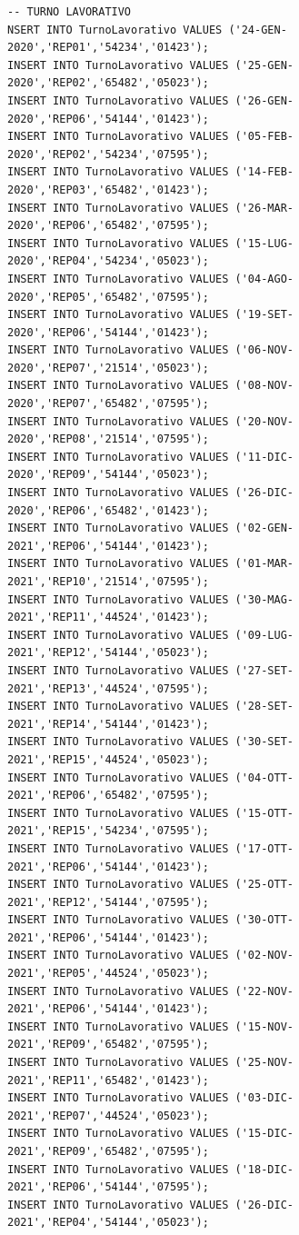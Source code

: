 \documentclass[12pt]{report}
\begin{document}
\begin{scriptsize}
\begin{verbatim}
-- TURNO LAVORATIVO
NSERT INTO TurnoLavorativo VALUES ('24-GEN-2020','REP01','54234','01423');
INSERT INTO TurnoLavorativo VALUES ('25-GEN-2020','REP02','65482','05023');
INSERT INTO TurnoLavorativo VALUES ('26-GEN-2020','REP06','54144','01423');
INSERT INTO TurnoLavorativo VALUES ('05-FEB-2020','REP02','54234','07595');
INSERT INTO TurnoLavorativo VALUES ('14-FEB-2020','REP03','65482','01423');
INSERT INTO TurnoLavorativo VALUES ('26-MAR-2020','REP06','65482','07595');
INSERT INTO TurnoLavorativo VALUES ('15-LUG-2020','REP04','54234','05023');
INSERT INTO TurnoLavorativo VALUES ('04-AGO-2020','REP05','65482','07595');
INSERT INTO TurnoLavorativo VALUES ('19-SET-2020','REP06','54144','01423');
INSERT INTO TurnoLavorativo VALUES ('06-NOV-2020','REP07','21514','05023');
INSERT INTO TurnoLavorativo VALUES ('08-NOV-2020','REP07','65482','07595');
INSERT INTO TurnoLavorativo VALUES ('20-NOV-2020','REP08','21514','07595');
INSERT INTO TurnoLavorativo VALUES ('11-DIC-2020','REP09','54144','05023');
INSERT INTO TurnoLavorativo VALUES ('26-DIC-2020','REP06','65482','01423');
INSERT INTO TurnoLavorativo VALUES ('02-GEN-2021','REP06','54144','01423');
INSERT INTO TurnoLavorativo VALUES ('01-MAR-2021','REP10','21514','07595');
INSERT INTO TurnoLavorativo VALUES ('30-MAG-2021','REP11','44524','01423');
INSERT INTO TurnoLavorativo VALUES ('09-LUG-2021','REP12','54144','05023');
INSERT INTO TurnoLavorativo VALUES ('27-SET-2021','REP13','44524','07595');
INSERT INTO TurnoLavorativo VALUES ('28-SET-2021','REP14','54144','01423');
INSERT INTO TurnoLavorativo VALUES ('30-SET-2021','REP15','44524','05023');
INSERT INTO TurnoLavorativo VALUES ('04-OTT-2021','REP06','65482','07595');
INSERT INTO TurnoLavorativo VALUES ('15-OTT-2021','REP15','54234','07595');
INSERT INTO TurnoLavorativo VALUES ('17-OTT-2021','REP06','54144','01423');
INSERT INTO TurnoLavorativo VALUES ('25-OTT-2021','REP12','54144','07595');
INSERT INTO TurnoLavorativo VALUES ('30-OTT-2021','REP06','54144','01423');
INSERT INTO TurnoLavorativo VALUES ('02-NOV-2021','REP05','44524','05023');
INSERT INTO TurnoLavorativo VALUES ('22-NOV-2021','REP06','54144','01423');
INSERT INTO TurnoLavorativo VALUES ('15-NOV-2021','REP09','65482','07595');
INSERT INTO TurnoLavorativo VALUES ('25-NOV-2021','REP11','65482','01423');
INSERT INTO TurnoLavorativo VALUES ('03-DIC-2021','REP07','44524','05023');
INSERT INTO TurnoLavorativo VALUES ('15-DIC-2021','REP09','65482','07595');
INSERT INTO TurnoLavorativo VALUES ('18-DIC-2021','REP06','54144','07595');
INSERT INTO TurnoLavorativo VALUES ('26-DIC-2021','REP04','54144','05023');


\end{verbatim}
\end{scriptsize}
\end{document}
